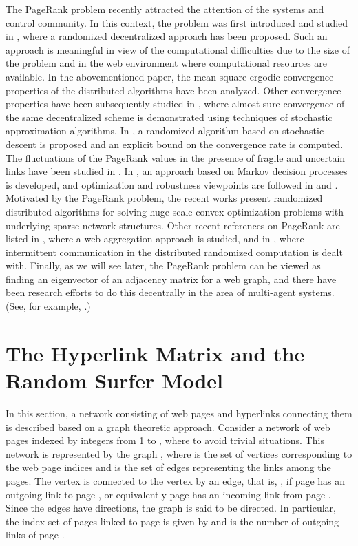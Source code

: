 \documentclass[11pt,draftcls,onecolumn]{IEEEtran}
\begin{document}
The PageRank problem recently attracted the attention of the systems and control community. 
In this context, the problem was first introduced and studied in \cite{IshTem:10}, where 
a randomized decentralized approach has been proposed. Such an approach is meaningful
in view of the computational difficulties due to the size of the problem and in the
web environment where computational resources are available. 
In the abovementioned paper, the mean-square ergodic convergence properties of 
the distributed algorithms have been analyzed. 
Other convergence properties have been 
subsequently studied in \cite{ZhaChFa:13}, where almost sure convergence of the same 
decentralized scheme is demonstrated using techniques of stochastic approximation algorithms.
In \cite{NazPol:11}, a randomized algorithm based on stochastic descent is proposed 
and an explicit bound on the convergence rate is computed. 
The fluctuations of the PageRank values in the presence of fragile and uncertain 
links have been studied in \cite{IshTem_sice:09}. 
In \cite{CsaJunBlo:09}, an approach based on 
Markov decision processes is developed, and optimization and robustness viewpoints are followed 
in \cite{FABG:13} and \cite{JudPol:12}.
Motivated by the PageRank problem, the recent works \cite{Nesterov:12,Necoara:13} present
randomized distributed algorithms for solving 
huge-scale convex optimization problems with underlying sparse network structures.
Other recent references on PageRank are listed in \cite{IshTemBai:12},
where a web aggregation approach is studied, and in \cite{IshTemBai_scl:12}, where
intermittent communication in the distributed randomized computation is dealt with.
Finally, as we will see later, the PageRank problem can be viewed as finding
an eigenvector of an adjacency matrix for a web graph, 
and there have been research efforts to do this decentrally in the 
area of multi-agent systems. (See, for example, \cite{KibCom:12}.)




\section*{The Hyperlink Matrix and the Random Surfer Model}

In this section, a network consisting of web pages and hyperlinks connecting them
is described based on a graph theoretic approach.
Consider a network of  web pages indexed by integers from 1 to , where
 to avoid trivial situations.
This network is represented by the graph ,
where  is the set of vertices corresponding 
to the web page indices and  is the set of edges representing
the links among the pages. 
The vertex  is connected to the vertex  by an edge, that is,
, if page  has an outgoing link to page ,
or equivalently page  has an incoming link from page .
Since the edges have directions, the graph  is said to be directed.
In particular, the index set of pages linked to page  is given by  and  is the number of outgoing links of page . 
\end{document}
